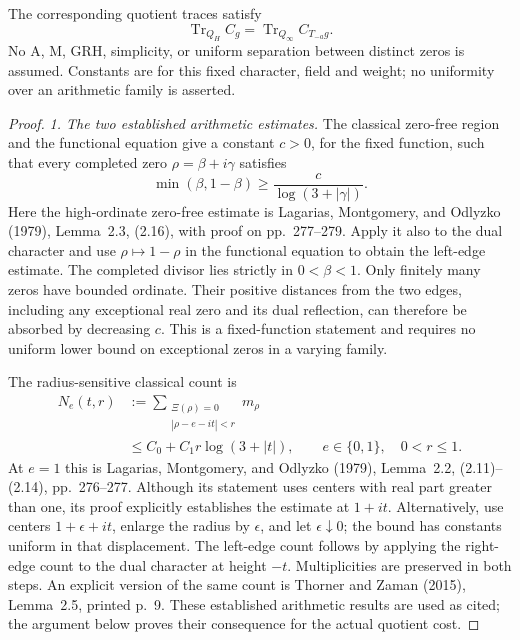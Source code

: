 The corresponding quotient traces satisfy
\[
       \operatorname{Tr}_{Q_H} C_g
        =\operatorname{Tr}_{Q_\infty}
                                  C_{T_{-a}g}.
 \tag{MA-PR.203}
\]
No A, M, GRH, simplicity, or uniform separation
between distinct zeros is assumed.  Constants are
for this fixed character, field and weight; no
uniformity over an arithmetic family is asserted.

\begin{proof}
\emph{1. The two established arithmetic estimates.}
The classical zero-free region and the functional
equation give a constant \(c>0\), for the fixed
function, such that every completed zero
\(\rho=\beta+i\gamma\) satisfies
\[
        \min(\beta,1-\beta)
                    \ge \frac{c}{\log(3+|\gamma|)}.
 \tag{MA-PR.204}
\]
Here the high-ordinate zero-free estimate is
Lagarias, Montgomery, and Odlyzko (1979),
Lemma~2.3, (2.16), with proof on pp.~277--279.
Apply it also to the dual character and use
\(\rho\mapsto1-\rho\) in the functional equation
to obtain the left-edge estimate.
The completed divisor lies strictly in \(0<\beta<1\).
Only finitely many zeros have bounded ordinate.
Their positive distances from the two edges,
including any exceptional real zero and its dual
reflection, can therefore be absorbed by decreasing
\(c\).  This is a fixed-function statement and
requires no uniform lower bound on exceptional
zeros in a varying family.

The radius-sensitive classical count is
\[
 \begin{split}
 N_e(t,r)
   &:=
      \sum_{\substack{\Xi(\rho)=0\\|\rho-e-it|<r}}
                                         m_\rho\\
   &\le C_0+C_1r\log(3+|t|),
       \qquad e\in\{0,1\},\quad 0<r\le1 .
 \end{split}
 \tag{MA-PR.205}
\]
At \(e=1\) this is Lagarias, Montgomery, and
Odlyzko (1979), Lemma~2.2, (2.11)--(2.14),
pp.~276--277.  Although its statement uses centers
with real part greater than one, its proof explicitly
establishes the estimate at \(1+it\).  Alternatively,
use centers \(1+\epsilon+it\), enlarge the radius
by \(\epsilon\), and let \(\epsilon\downarrow0\);
the bound has constants uniform in that displacement.
The left-edge count follows by applying the
right-edge count to the dual character at height
\(-t\).  Multiplicities are preserved in both
steps.  An explicit version of the same count is
Thorner and Zaman (2015), Lemma~2.5, printed p.~9.
These established arithmetic results are used as
cited; the argument below proves their consequence
for the actual quotient cost.


\end{proof}
